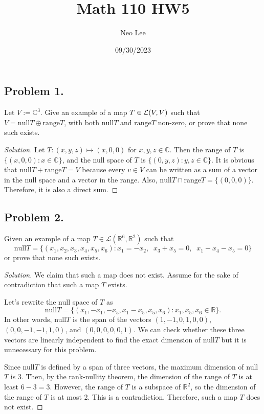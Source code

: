 \documentclass{article}
\title{Math 110 HW5}
\author{Neo Lee}
\date{09/30/2023}
\begin{document}
 

\maketitle 

\subsection*{Problem 1.}
Let $V:= \mathbb{C}^3$. Give an example of a map $T\in {\cal L}(V,V)$ such that 
$V=\mathrm{null} T\oplus \mathrm{range} T$, with both $\mathrm{null} T$ and $\mathrm{range} T$ 
non-zero, or prove that none such exists.

\begin{proof}[Solution]
    Let $T:(x,y,z)\mapsto(x,0,0)$ for $x,y,z\in\mathbb{C}$. Then the range of $T$ is 
    $\{(x,0,0):x\in\mathbb{C}\}$, and the null space of $T$ is $\{(0,y,z):y,z\in\mathbb{C}\}$.
    It is obvious that $\mathrm{null}T + \mathrm{range}T = V$ because every $v\in V$ can be written 
    as a sum of a vector in the null space and a vector in the range. 
    Also, $\mathrm{null}T\cap\mathrm{range}T = \{(0,0,0)\}$. Therefore, it is also a direct sum.
\end{proof}

\newpage
\subsection*{Problem 2.}
Given an example of a map $T\in {\mathcal{L}}(\mathbb{R}^6,\mathbb{R}^2)$ such that
$$ \mathrm{null} T =\{(x_1,x_2,x_3,x_4,x_5,x_6) : x_1=-x_2, \;\; x_3+x_5 =0, \;\; x_1-x_4-x_5=0\}$$
or prove that none such exists.
\begin{proof}[Solution]
    We claim that such a map does not exist. Assume for the sake of contradiction that such a map
    $T$ exists.

    Let's rewrite the null space of $T$ as
    $$ \mathrm{null} T =\{(x_1,-x_1,-x_5,x_1-x_5,x_5,x_6) : x_1, x_5, x_6\in\mathbb{R}\}.$$
    In other words, null$T$ is the span of the vectors $(1,-1,0,1,0,0)$, $(0,0,-1,-1,1,0)$, and 
    $(0,0,0,0,0,1)$. We can check whether these three vectors are linearly independent to find the 
    exact dimension of null$T$ but it is unnecessary for this problem. 
    
    Since null$T$ is defined by a span of three vectors, the maximum dimension of null$T$ is 3. 
    Then, by the rank-nullity theorem, the dimension of the range of $T$ is at least $6-3=3$. 
    However, the range of $T$ is a subspace of $\mathbb{R}^2$, so the dimension of the range of $T$ 
    is at most 2. This is a contradiction. Therefore, such a map $T$ does not exist.
\end{proof}
\end{document}
